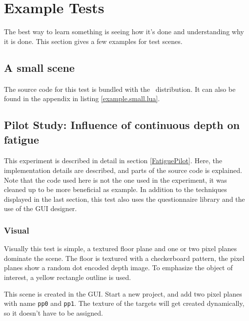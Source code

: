 \section{Example Tests}
\paragraph{}
The best way to learn something is seeing how it's done and understanding why it is done.
This section gives a few examples for test scenes.

\subsection{A small scene}
\paragraph{}
The source code for this test is bundled with the \ER\ distribution.
It can also be found in the appendix in listing \ref{example.small.lua}.


\subsection[Influence of continuous depth]{Pilot Study: Influence of continuous depth on fatigue\label{ExampleFatiguePilot}}
\paragraph{}
This experiment is described in detail in section \ref{FatiguePilot}.
Here, the implementation details are described, and parts of the source code is explained.
Note that the code used here is not the one used in the experiment, it was cleaned up to be more beneficial as example.
In addition to the techniques displayed in the last section, this test also uses the questionnaire library and the use of the GUI designer.

\subsubsection{Visual}
Visually this test is simple, a textured floor plane and one or two pixel planes dominate the scene.
The floor is textured with a checkerboard pattern, the pixel planes show a random dot encoded depth image.
To emphasize the object of interest, a yellow rectangle outline is used.

This scene is created in the GUI.
Start a new project, and add two pixel planes with name \texttt{pp0} and \texttt{pp1}.
The texture of the targets will get created dynamically, so it doesn't have to be assigned.

